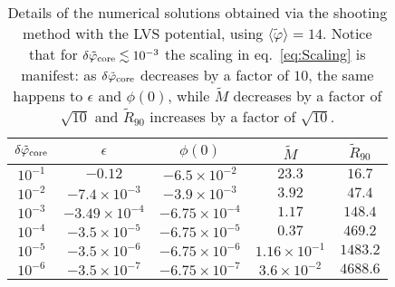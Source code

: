 \documentclass[11pt,a4paper]{article}
\newcommand\Tstrut{\rule{0pt}{2.6ex}}         %
\newcommand\Bstrut{\rule[-0.9ex]{0pt}{0pt}}   %
\begin{document}
\begin{table}[h!]
\centering
\begin{tabular}{ccccc}
\hline
$\delta\tilde\varphi_{\rm core}$ & $\epsilon$ & $\phi(0)$ & $\tilde{M} $ & $\tilde{R}_{90}$ \Tstrut\Bstrut\\
\hline
$10^{-1}$ & $-0.12$ & $-6.5 \times 10^{-2}$ & $23.3$ & $16.7$ \\
$10^{-2}$ & $-7.4 \times 10^{-3}$ & $-3.9 \times 10^{-3}$ & $3.92$ & $47.4$ \\
$10^{-3}$ & $-3.49 \times 10^{-4}$ & $-6.75 \times 10^{-4}$ & $1.17$ & $148.4$ \\
$10^{-4}$ & $-3.5 \times 10^{-5}$ & $-6.75 \times 10^{-5}$ & $0.37$ & $469.2$ \\
$10^{-5}$ & $-3.5 \times 10^{-6}$ & $-6.75 \times 10^{-6}$ & $1.16 \times 10^{-1}$ & $1483.2$ \\
$10^{-6}$ & $-3.5 \times 10^{-7}$ & $-6.75 \times 10^{-7}$ & $3.6 \times 10^{-2}$ & $4688.6$ \\
\hline
\end{tabular}
\caption{Details of the numerical solutions obtained via the shooting method with the LVS potential, using $\langle\tilde{\varphi}\rangle = 14$. Notice that for $\delta\tilde{\varphi}_{\rm core} \lesssim 10^{-3}$ the scaling in eq.~\eqref{eq:Scaling} is manifest: as $\delta\tilde{\varphi}_{\rm core}$ decreases by a factor of $10$, the same happens to $\epsilon$ and $\phi(0)$, while $\tilde{M}$ decreases by a factor of $\sqrt{10}$ and $\tilde{R}_{90}$ increases by a factor of $\sqrt{10}$.}
\label{tab:ParametersShooting}
\end{table}
\end{document}
